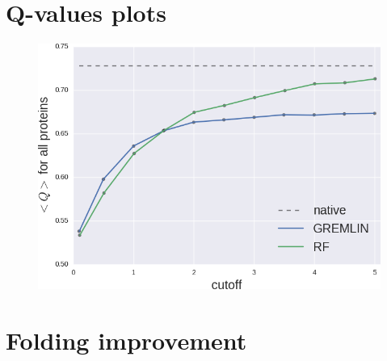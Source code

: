 \documentclass[landscape]{sciposter}
\newlength{\customfigheight}
\begin{document}
\begin{multicols}{3}

\section*{Q-values plots}
\begin{figure}
    \center 
    \includegraphics[height=\customfigheight]{figures/folding/Q_avg.png}
\end{figure}

\columnbreak

\section*{Folding improvement}


\end{multicols}
\end{document}
